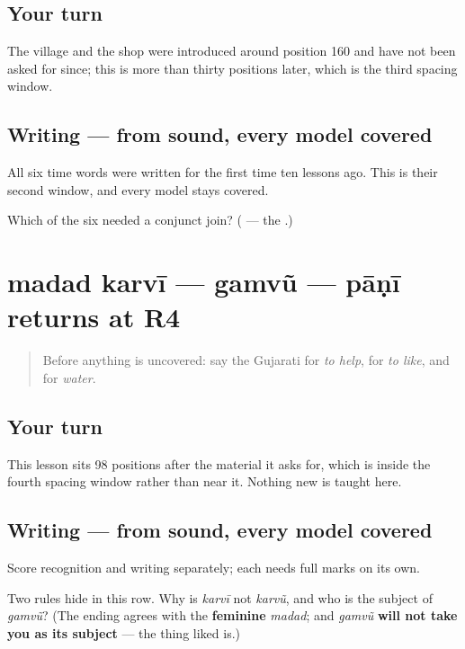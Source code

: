 \subsection*{Your turn}
The village and the shop were introduced around position 160 and have not been asked for since; this is more than thirty positions later, which is the third spacing window.

\subsection*{Writing — from sound, every model covered}
All six time words were written for the first time ten lessons ago. This is their second window, and every model stays covered.

\begin{tcolorbox}[breakable,colback=teal!4,colframe=teal!35!black,title={Before you move on}]
Which of the six needed a conjunct join? (\textbf{} — the \textbf{}.)
\end{tcolorbox}
\section[Practice]{madad karvī — gamvũ — pāṇī returns at R4}

\label{lesson:GU-R26-madad-gamvun-paani-r4}



\begin{quote}
Before anything is uncovered: say the Gujarati for \emph{to help}, for \emph{to like}, and for \emph{water}.
\end{quote}

\subsection*{Your turn}
This lesson sits 98 positions after the material it asks for, which is inside the fourth spacing window rather than near it. Nothing new is taught here.

\subsection*{Writing — from sound, every model covered}
Score recognition and writing separately; each needs full marks on its own.

\begin{tcolorbox}[breakable,colback=teal!4,colframe=teal!35!black,title={Before you move on}]
Two rules hide in this row. Why is \emph{karvī} not \emph{karvũ}, and who is the subject of \emph{gamvũ}? (The ending agrees with the \textbf{feminine} \emph{madad}; and \emph{gamvũ} \textbf{will not take you as its subject} — the thing liked is.)
\end{tcolorbox}
